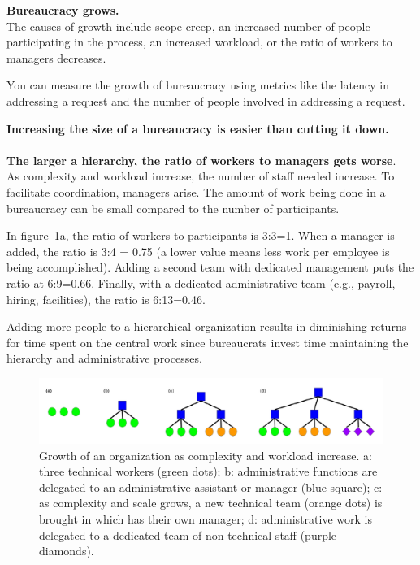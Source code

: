 \textbf{Bureaucracy grows.}\\
The causes of growth include
scope creep, an increased number of people participating in the process, an increased workload, or the ratio of workers to managers decreases. 

You can measure the growth of bureaucracy using metrics like the latency in addressing a request and 
the number of people involved in addressing a request.  

\textbf{Increasing the size of a bureaucracy is easier than cutting it down.}\\
\ \\

\textbf{The larger a hierarchy, the ratio of workers to managers gets worse}. \\

As complexity and workload increase, the number of staff needed increase. To facilitate coordination, managers arise. The amount of work being done in a bureaucracy can be small compared to the number of participants.

In figure~\ref{fig:growth_of_bureaucracy}a, the ratio of workers to participants is 3:3=1. When a manager is added, the ratio is 3:4 = 0.75 (a lower value means less work per employee is being accomplished). Adding a second team with dedicated management puts the ratio at 6:9=0.66. Finally, with a dedicated administrative team (e.g., payroll, hiring, facilities), the ratio is 6:13=0.46.

Adding more people to a hierarchical organization results in diminishing returns for time spent on the central work since bureaucrats invest time maintaining the hierarchy and administrative processes.

    \begin{figure}
        \centering
        \includegraphics[width=1\textwidth]{images/growth-of-bureaucracy.pdf}
        \caption{Growth of an organization as complexity and workload increase. a: three technical workers (green dots); b: administrative functions are delegated to an administrative assistant or manager (blue square); c: as complexity and scale grows, a new technical team (orange dots) is brought in which has their own manager; d: administrative work is delegated to a dedicated team of non-technical staff (purple diamonds).}
        \label{fig:growth_of_bureaucracy}
    \end{figure}

